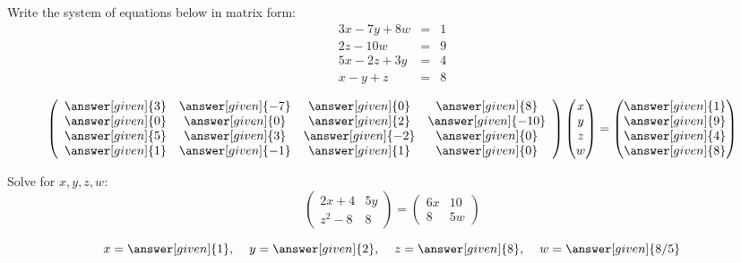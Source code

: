 \documentclass{ximera}
\begin{document}
\begin{question}
Write the system of equations below in matrix form:
\begin{eqnarray*}
3x-7y+8w &=& 1\\
2z -10w &=& 9\\
5x-2z+3y &=& 4\\
x-y+z &=& 8
\end{eqnarray*}
\begin{prompt}
\[
\left(\begin{array}{cccc}
\answer[given]{3} & \answer[given]{-7} & \answer[given]{0} & \answer[given]{8}\\
\answer[given]{0} & \answer[given]{0} & \answer[given]{2} & \answer[given]{-10}\\
\answer[given]{5} & \answer[given]{3} & \answer[given]{-2} & \answer[given]{0}\\
\answer[given]{1} & \answer[given]{-1} & \answer[given]{1} & \answer[given]{0}
\end{array}\right) \begin{pmatrix}
x\\
y\\
z\\
w
\end{pmatrix} = \begin{pmatrix}
\answer[given]{1}\\
\answer[given]{9}\\
\answer[given]{4}\\
\answer[given]{8}
\end{pmatrix}
\]
\end{prompt}
\end{question}

\begin{question}
Solve for $x, y, z, w$:
\[\left(\begin{array}{cc}
2x+4 & 5y \\
z^2-8 & 8
\end{array}\right) = \left(\begin{array}{cc}
6x & 10\\
8 & 5w
\end{array}\right)
\]
\begin{prompt}
\[
x= \answer[given]{1}, \hspace{.4cm} y = \answer[given]{2}, \hspace{.4cm} z = \answer[given]{8}, \hspace{.4cm} w = \answer[given]{8/5}
\]
\end{prompt}
\end{question}
\end{document}
